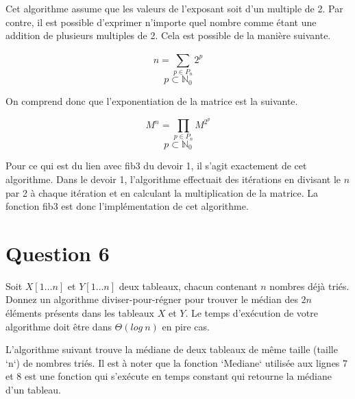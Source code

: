 \documentclass[12pt]{article}
\begin{document}
Cet algorithme assume que les valeurs de l'exposant soit d'un multiple de 2. Par contre, il est possible d'exprimer n'importe quel nombre comme étant une addition de plusieurs multiples de 2. Cela est possible de la manière suivante.

\[ n = \sum_{p \in P_n}^{} 2^p \]
\[ p \subset \mathbb{N}_0 \]

On comprend donc que l'exponentiation de la matrice est la suivante.

\[ M^n = \prod_{p \in P_n}^{} M^{2^p} \]
\[ p \subset \mathbb{N}_0 \]

Pour ce qui est du lien avec fib3 du devoir 1, il s'agit exactement de cet algorithme. Dans le devoir 1, l'algorithme effectuait des itérations en divisant le \( n \) par 2 à chaque itération et en calculant la multiplication de la matrice. La fonction fib3 est donc l'implémentation de cet algorithme.

\newpage

\section*{Question 6}
Soit \(X[1 \dots n]\) et \(Y [1 \dots n]\) deux tableaux, chacun contenant \(n\) nombres déjà triés. Donnez un algorithme diviser-pour-régner pour trouver le médian des \(2n\) éléments présents dans les tableaux \(X\) et \(Y\). Le temps d’exécution de votre algorithme doit être dans \(\Theta (log \: n)\) en pire cas.

\begin{flushleft}
L'algorithme suivant trouve la médiane de deux tableaux de même taille (taille `n`) de nombres triés. Il est à noter que la fonction `Mediane` utilisée aux lignes 7 et 8 est une fonction qui s'exécute en temps constant qui retourne la médiane d'un tableau.
\end{flushleft}
\end{document}
